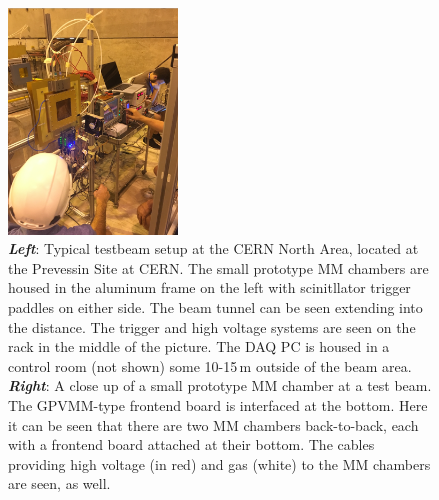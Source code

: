 \begin{figure}[!htb]
    \begin{center}
        \includegraphics[width=0.4\textwidth]{figures/nsw/use_cases/verso_testbeam2}
        \caption{
            \textbf{\textit{Left}}: Typical testbeam setup at the CERN North Area, located at the Prevessin Site at CERN.
                The small prototype MM chambers are housed in the aluminum frame on the left with scinitllator
                trigger paddles on either side.
                The beam tunnel can be seen extending into the distance.
                The trigger and high voltage systems are seen on the rack in the middle of the picture.
                The DAQ PC is housed in a control room (not shown) some 10-15\,m outside of the beam area.
            \textbf{\textit{Right}}: A close up of a small prototype MM chamber at a test beam. The
                GPVMM-type frontend board is interfaced at the bottom. Here it can be seen that there
                are two MM chambers back-to-back, each with a frontend board attached at their bottom.
                The cables providing high voltage (in red) and gas (white) to the MM chambers are seen, as well.
        }
        \label{fig:vrs_testbeam}
    \end{center}
\end{figure}

